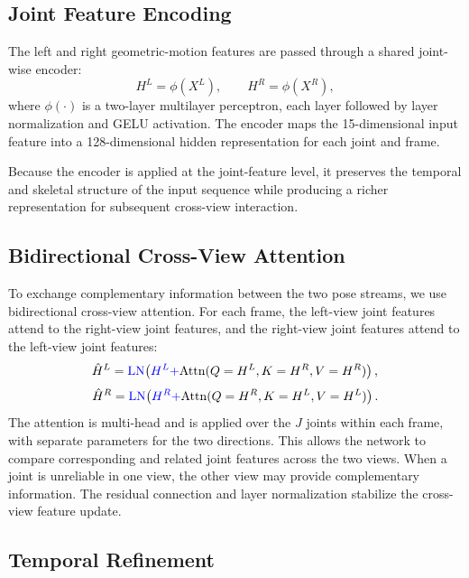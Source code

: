 \documentclass[preprint,12pt]{elsarticle}
\providecommand{\DIFaddbegin}{} %
\providecommand{\DIFaddend}{} %
\providecommand{\DIFadd}[1]{{\protect\color{blue}#1}} %
\begin{document}
 \subsection{Joint Feature Encoding}
\label{subsec:joint_feature_encoding}

The left and right geometric-motion features are passed through a shared joint-wise encoder:
\[
H^{L} = \phi(X^{L}),
\qquad
H^{R} = \phi(X^{R}),
\]
where \(\phi(\cdot)\) is a  \DIFaddbegin \DIFadd{two-layer multilayer perceptron, each layer followed by layer }\DIFaddend normalization and GELU activation. The encoder maps the 15-dimensional input feature into a \DIFaddbegin \DIFadd{128-dimensional }\DIFaddend hidden representation for each joint and frame.

Because the encoder is applied at the joint-feature level, it preserves the temporal and skeletal structure of the input sequence while producing a richer representation for subsequent cross-view interaction.

\subsection{Bidirectional Cross-View Attention}
\label{subsec:cross_view_attention}

To exchange complementary information between the two pose streams, we use bidirectional cross-view attention. For each frame, the left-view joint features attend to the right-view joint features, and the right-view joint features attend to the left-view joint features:
\[
\hat{H}^{L}
=
\DIFaddbegin \DIFadd{\mathrm{LN}\!}\left(\DIFadd{H^{L}+}\DIFaddend \mathrm{Attn}(Q=H^{L}, K=H^{R}, V=H^{R})\DIFaddbegin \right)\DIFaddend ,
\]
\[
\hat{H}^{R}
=
\DIFaddbegin \DIFadd{\mathrm{LN}\!}\left(\DIFadd{H^{R}+}\DIFaddend \mathrm{Attn}(Q=H^{R}, K=H^{L}, V=H^{L})\DIFaddbegin \right)\DIFaddend .
\]
 The attention is  \DIFaddbegin \DIFadd{multi-head and is applied over the \(J\) }\DIFaddend joints within each frame\DIFaddbegin \DIFadd{, with separate parameters for the two directions}\DIFaddend . This allows the network to compare corresponding and related joint features across the two views. When a joint is unreliable in one view, the other view may provide complementary information.  \DIFaddbegin \DIFadd{The residual connection }\DIFaddend and layer normalization  stabilize the cross-view feature update.

\subsection{Temporal Refinement}
\label{subsec:temporal_refinement}
\end{document}
